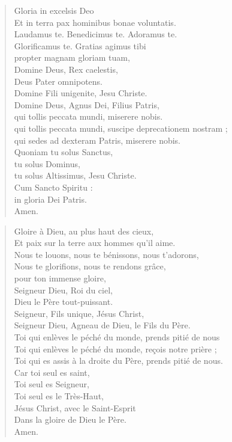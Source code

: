 {\bf
\begin{minipage}[t]{0.5\textwidth}
\begin{verse}
Gloria in excelsis Deo\\
Et in terra pax hominibus bonae voluntatis.\\
Laudamus te. Benedicimus te. Adoramus te.\\
Glorificamus te. Gratias agimus tibi\\
propter magnam gloriam tuam,\\
Domine Deus, Rex caelestis,\\
Deus Pater omnipotens.\\
Domine Fili unigenite, Jesu Christe.\\
Domine Deus, Agnus Dei, Filius Patris,\\
qui tollis peccata mundi, miserere nobis.\\
qui tollis peccata mundi, suscipe deprecationem nostram ;\\
qui sedes ad dexteram Patris, miserere nobis.\\
Quoniam tu solus Sanctus,\\
tu solus Dominus,\\
tu solus Altissimus, Jesu Christe.\\
Cum Sancto Spiritu :\\
in gloria Dei Patris. \\
Amen.\\
\end{verse}
\end{minipage}
\begin{minipage}[t]{0.5\textwidth}
\begin{verse}
Gloire à Dieu, au plus haut des cieux, \\
Et paix sur la terre aux hommes qu'il aime.\\
Nous te louons, nous te bénissons, nous t'adorons,\\
Nous te glorifions, nous te rendons grâce,\\
pour ton immense gloire,\\
Seigneur Dieu, Roi du ciel,\\
Dieu le Père tout-puissant.\\
Seigneur, Fils unique, Jésus Christ,\\
Seigneur Dieu, Agneau de Dieu, le Fils du Père.\\
Toi qui enlèves le péché du monde, prends pitié de nous\\
Toi qui enlèves le péché du monde, reçois notre prière ;\\
Toi qui es assis à la droite du Père, prends pitié de nous.\\
Car toi seul es saint,\\
Toi seul es Seigneur,\\
Toi seul es le Très-Haut,\\
Jésus Christ, avec le Saint-Esprit\\
Dans la gloire de Dieu le Père. \\
Amen.\\
\end{verse}
\end{minipage}
}


